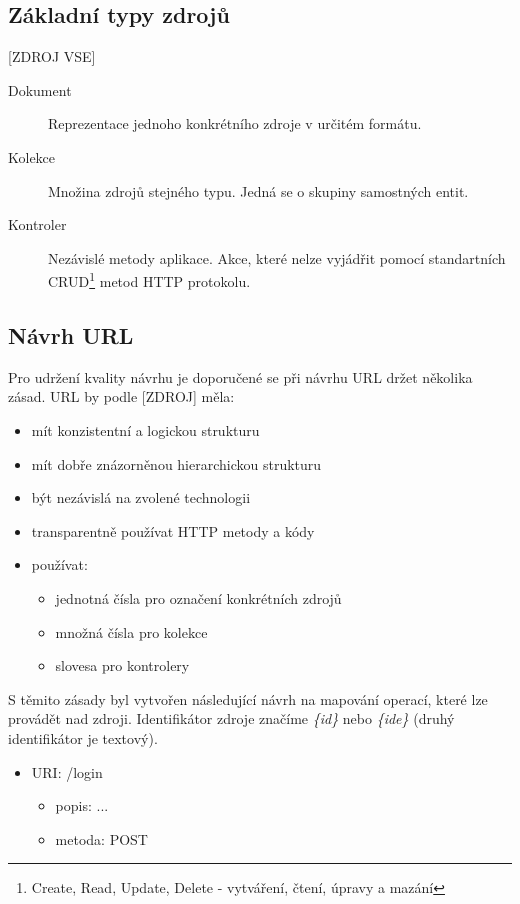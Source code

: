 \documentclass[thesis=B,czech]{FITthesis}[2012/06/26]
\begin{document}
\subsection{Základní typy zdrojů}

[ZDROJ VSE]
\begin{description}
  \item[Dokument] Reprezentace jednoho konkrétního zdroje v určitém formátu.
  \item[Kolekce] Množina zdrojů stejného typu. Jedná se o skupiny samostných entit.
  \item[Kontroler] Nezávislé metody aplikace. Akce, které nelze vyjádřit pomocí standartních
  CRUD\footnote{Create, Read, Update, Delete - vytváření, čtení, úpravy a mazání} metod HTTP protokolu.
\end{description}

\subsection{Návrh URL}

\indent

Pro udržení kvality návrhu je doporučené se při návrhu URL držet několika zásad. URL by podle [ZDROJ] měla:
\begin{itemize}
\item mít konzistentní a logickou strukturu
\item mít dobře znázorněnou hierarchickou strukturu
\item být nezávislá na zvolené technologii
\item transparentně používat HTTP metody a kódy
\item používat:
\begin{itemize}
\item jednotná čísla pro označení konkrétních zdrojů
\item množná čísla pro kolekce
\item slovesa pro kontrolery
\end{itemize}
\end{itemize}

S těmito zásady byl vytvořen následující návrh na mapování operací, které lze provádět nad zdroji.
Identifikátor zdroje značíme \textit{\{id\}} nebo \textit{\{ide\}} (druhý identifikátor je textový).

\begin{itemize}
\item URI: /login
\begin{itemize}
\item popis: ...
\item metoda: POST
\end{itemize}
\end{itemize}
\end{document}
